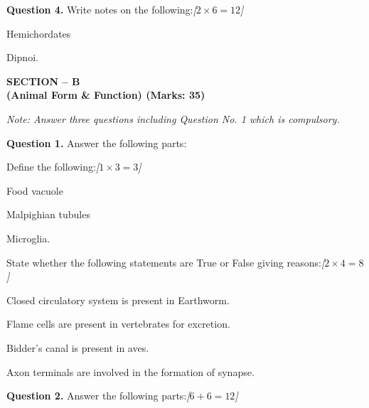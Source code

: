 \documentclass[11pt,a4paper]{article}
\newcommand{\pts}[1]{\hfill   \textit{[#1]}}
\begin{document}
\medskip


\noindent   \textbf{Question 4.} Write notes on the following:\pts{$2  \times 6 = 12$}

\begin{parts}
  \item Hemichordates
  \item Dipnoi.
\end{parts}

\pagebreak

\begin{center}
   \textbf{SECTION -- B} \\
   \textbf{(Animal Form \& Function) (Marks: 35)}
\end{center}

\smallskip



\noindent   \textit{Note: Answer three questions including Question No. 1 which is compulsory.}

\medskip


\noindent   \textbf{Question 1.} Answer the following parts:

\begin{parts}
  \item Define the following:\pts{$1  \times 3 = 3$}
  
\begin{parts}
    \item Food vacuole
    \item Malpighian tubules
    \item Microglia.
  \end{parts}

  \item State whether the following statements are True or False giving reasons:\pts{$2  \times 4 = 8$}
  
\begin{parts}
    \item Closed circulatory system is present in Earthworm.
    \item Flame cells are present in vertebrates for excretion.
    \item Bidder's canal is present in aves.
    \item Axon terminals are involved in the formation of synapse.
  \end{parts}
\end{parts}

\medskip


\noindent   \textbf{Question 2.} Answer the following parts:\pts{$6 + 6 = 12$}
\end{document}
